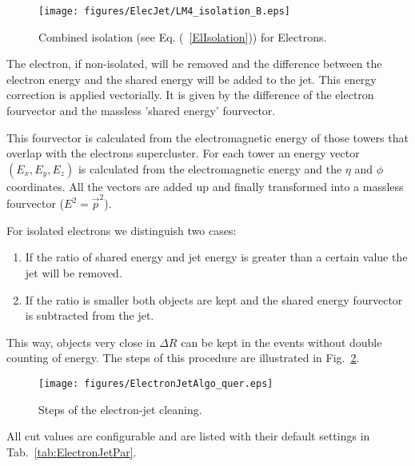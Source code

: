 \documentclass{cmspaper}
\begin{document}
\begin{figure}[hbt]
  \begin{center}
    \texttt{[image: figures/ElecJet/LM4\_isolation\_B.eps]}
    \caption{Combined isolation (see Eq. (~\ref{ElIsolation})) for Electrons.}
    \label{fig:ElectronIsolation}
  \end{center}
\end{figure}

The electron, if non-isolated, will be removed and the difference between
the electron energy and the shared energy will be added to the jet. This energy
correction is applied vectorially. It is given by the difference of the electron
fourvector and the massless 'shared energy' fourvector.

This fourvector is calculated from the electromagnetic energy of those towers
that overlap with the electrons supercluster. For each
tower an energy vector $(E_x, E_y, E_z)$ is calculated from the electromagnetic
energy and the $\eta$ and $\phi$ coordinates. All the vectors are added
up and finally transformed into a massless fourvector ($E^2=\vec{p}^2$).

For isolated electrons we distinguish two cases:
\begin{enumerate}
\item If the ratio of shared energy and jet energy is greater than a certain
value the jet will be removed. 
\item If the ratio is smaller both objects are kept and the shared energy
fourvector is subtracted from the jet. 
\end{enumerate}
This way, objects very close in $\Delta R$ can be kept
in the events without double counting of energy.  The steps of this procedure
are illustrated in Fig.~\ref{fig:EJCleaning}.

\begin{figure}[hbt]
  \begin{center}
    \texttt{[image: figures/ElectronJetAlgo\_quer.eps]}
    \caption{Steps of the electron-jet cleaning.}
    \label{fig:EJCleaning}
  \end{center}
\end{figure}

All cut values are configurable and are listed with their default settings in
Tab.~\ref{tab:ElectronJetPar}.
\end{document}
